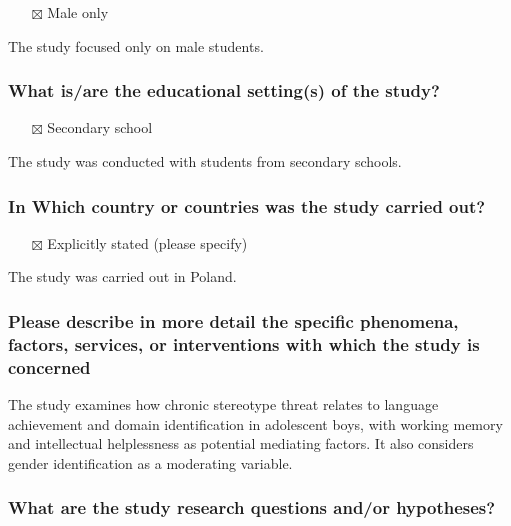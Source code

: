 \documentclass[
  doc, a4paper]{apa7}
\providecommand{\tightlist}{%
  \setlength{\itemsep}{0pt}\setlength{\parskip}{0pt}}
\begin{document}
\begin{itemize}
\tightlist
\item[$\boxtimes$]
  Male only
\end{itemize}

The study focused only on male students.

\subsubsection{What is/are the educational setting(s) of the study?}\label{what-isare-the-educational-settings-of-the-study}

\begin{itemize}
\tightlist
\item[$\boxtimes$]
  Secondary school
\end{itemize}

The study was conducted with students from secondary schools.

\subsubsection{In Which country or countries was the study carried out?}\label{in-which-country-or-countries-was-the-study-carried-out}

\begin{itemize}
\tightlist
\item[$\boxtimes$]
  Explicitly stated (please specify)
\end{itemize}

The study was carried out in Poland.

\subsubsection{Please describe in more detail the specific phenomena, factors, services, or interventions with which the study is concerned}\label{please-describe-in-more-detail-the-specific-phenomena-factors-services-or-interventions-with-which-the-study-is-concerned}

The study examines how chronic stereotype threat relates to language achievement and domain identification in adolescent boys, with working memory and intellectual helplessness as potential mediating factors. It also considers gender identification as a moderating variable.

\subsubsection{What are the study research questions and/or hypotheses?}\label{what-are-the-study-research-questions-andor-hypotheses}
\end{document}
